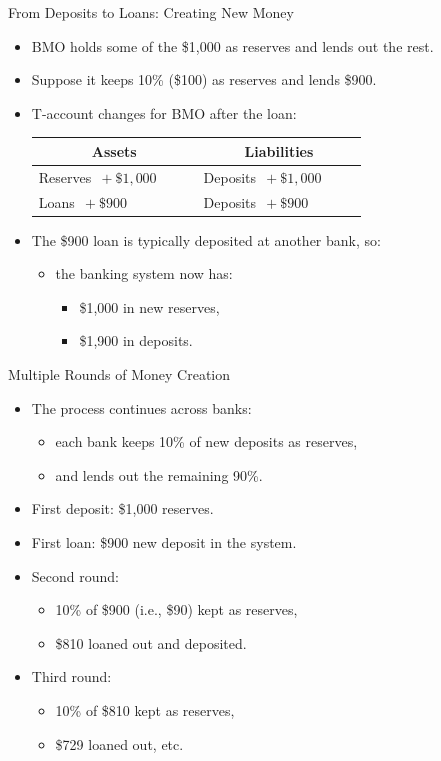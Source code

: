 \documentclass[aspectratio=169]{beamer}
\begin{document}
\begin{frame}{From Deposits to Loans: Creating New Money}
\transfade
\begin{itemize}
  \item BMO holds some of the \$1{,}000 as reserves and lends out the rest.
  \item Suppose it keeps 10\% (\$100) as reserves and lends \$900.
  \item T-account changes for BMO after the loan:
  \begin{center}
    \begin{tabular}{p{0.4\linewidth} p{0.4\linewidth}}
    \toprule
    \multicolumn{1}{c}{\textbf{Assets}} & \multicolumn{1}{c}{\textbf{Liabilities}} \\
    \midrule
    Reserves \(\,+ \$1{,}000\) & Deposits \(\,+ \$1{,}000\) \\
    Loans \(\,+ \$900\) & Deposits \(\,+ \$900\) \\
    \bottomrule
    \end{tabular}
  \end{center}
  \item The \$900 loan is typically deposited at another bank, so:
  \begin{itemize}
    \item the banking system now has:
    \begin{itemize}
      \item \$1{,}000 in new reserves,
      \item \$1{,}900 in deposits.
    \end{itemize}
  \end{itemize}
\end{itemize}
\end{frame}

\begin{frame}{Multiple Rounds of Money Creation}
\transfade
\begin{itemize}
  \item The process continues across banks:
  \begin{itemize}
    \item each bank keeps 10\% of new deposits as reserves,
    \item and lends out the remaining 90\%.
  \end{itemize}
  \item First deposit: \$1{,}000 reserves.
  \item First loan: \$900 new deposit in the system.
  \item Second round:
  \begin{itemize}
    \item 10\% of \$900 (i.e., \$90) kept as reserves,
    \item \$810 loaned out and deposited.
  \end{itemize}
  \item Third round:
  \begin{itemize}
    \item 10\% of \$810 kept as reserves,
    \item \$729 loaned out, etc.
  \end{itemize}
\end{itemize}
\end{frame}
\end{document}
